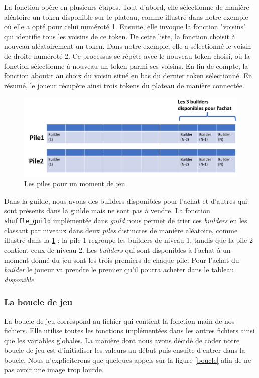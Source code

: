 \documentclass{article}
\begin{document}
\hspace{1.5em}La fonction opère en plusieurs étapes. Tout d'abord, elle sélectionne de manière aléatoire un token disponible sur le plateau, comme illustré dans notre exemple où elle a opté pour celui numéroté 1. Ensuite, elle invoque la fonction "voisins" qui identifie tous les voisins de ce token. De cette liste, la fonction choisit à nouveau aléatoirement un token. Dans notre exemple, elle a sélectionné le voisin de droite numéroté 2. Ce processus se répète avec le nouveau token choisi, où la fonction sélectionne à nouveau un token parmi ses voisins. En fin de compte, la fonction aboutit au choix du voisin situé en bas du dernier token sélectionné. En résumé, le joueur récupère ainsi trois tokens du plateau de manière connectée.

\vspace{2em}
 
\begin{figure}[ht]
    \centering
    \includegraphics[width=0.6\linewidth]{lespiles.PNG}
    \caption{Les piles pour un moment de jeu}
    \label{fig:lespiles}
\end{figure}
 Dans la guilde, nous avons des builders disponibles pour l'achat et d'autres qui sont présents dans la guilde mais ne sont pas à vendre. La fonction \texttt{shuffle\_guild} implémentée dans \emph{guild} nous permet de trier ces \emph{builders} en les classant par niveaux dans deux \emph{piles} distinctes de manière aléatoire, comme illustré dans la \ref{fig:lespiles} : la pile 1 regroupe les builders de niveau 1, tandis que la pile 2 contient ceux de niveau 2. Les \emph{builders} qui sont disponibles à l'achat à un moment donné du jeu sont les trois premiers de chaque pile. Pour l'achat du \emph{builder} le joueur va prendre le premier qu'il pourra acheter dans le tableau \emph{disponible}. 


\subsubsection{La boucle de jeu}

\hspace{1em} La boucle de jeu correspond au fichier qui contient la fonction main de nos fichiers. Elle utilise toutes les fonctions implémentées dans les autres fichiers ainsi que les variables globales. La manière dont nous avons décidé de coder notre boucle de jeu est d'initialiser les valeurs au début puis ensuite d'entrer dans la boucle. Nous n'expliciterons que quelques appels sur la figure \ref{boucle} afin de ne pas avoir une image trop lourde.
\end{document}
